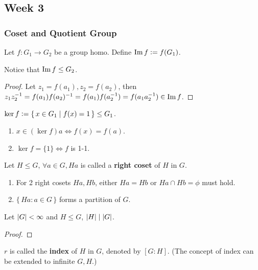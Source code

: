 \subsection{Week 3}
\subsubsection{Coset and Quotient Group}
Let $f: G_1 \to G_2$ be a group homo. Define $\operatorname{Im} f \vcentcolon= f(G_1)$.

Notice that $\operatorname{Im} f \le G_2$.
\begin{proof}
  Let $z_1 = f(a_1), z_2 = f(a_2)$, then
  $z_1z_2^{-1} = f(a_1)f(a_2)^{-1} = f(a_1)f(a_2^{-1}) = f(a_1a_2^{-1}) \in
  \operatorname{Im} f$.
\end{proof}

\begin{definition}
  $\ker f \vcentcolon= \{\, x \in G_1 \mid f(x) = 1 \,\} \le G_1$.
\end{definition}

\begin{fact} \mbox{}
  \begin{enumerate}
    \item $x \in (\ker f) a \iff f(x) = f(a)$.
    \item $\ker f = \{ 1 \} \iff f$ is 1-1.
  \end{enumerate}
\end{fact}

\begin{definition}
  Let $H \le G$, $\forall a \in G, Ha$ is called a {\bf right coset} of $H$
  in $G$.
\end{definition}

\begin{fact} \mbox{}
  \begin{enumerate}
    \item For 2 right cosets $Ha, Hb$, either $Ha = Hb$ or $Ha \cap Hb = \phi$
      must hold.
    \item $\{\, Ha : a\in G \,\}$ forms a partition of $G$.
  \end{enumerate}
\end{fact}

\begin{theorem}[Lagrange]
  Let $\lvert G\rvert < \infty$ and $H \le G$, $\lvert H\rvert \mid \lvert G\rvert$.
  \begin{proof}
  \end{proof}
\end{theorem}

\begin{remark}
  $r$ is called the {\bf index} of $H$ in $G$, denoted by $[G:H]$.
  (The concept of index can be extended to infinite $G, H$.)
\end{remark}

